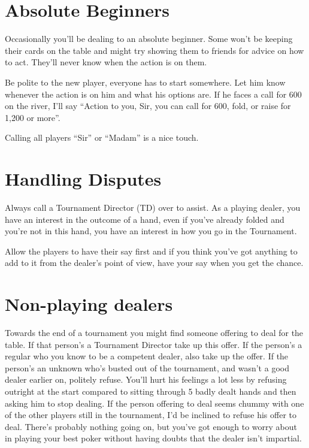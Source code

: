 \section{Absolute Beginners}

Occasionally you'll be dealing to an absolute beginner. Some won't be
keeping their cards on the table and might try showing them to friends
for advice on how to act. They'll never know when the action is on them.

Be polite to the new player, everyone has to start somewhere. Let him
know whenever the action is on him and what his options are. If he
faces a call for 600 on the river, I'll say ``Action to you, Sir, you
can call for 600, fold, or raise for 1,200 or more''.

Calling all players ``Sir'' or ``Madam'' is a nice touch.

\section{Handling Disputes}

Always call a Tournament Director (TD) over to assist. As a playing
dealer, you have an interest in the outcome of a hand, even
if you've already folded and you're not in this hand, you have
an interest in how you go in the Tournament.

Allow the players to have their say first and if you think you've
got anything to add to it from the dealer's point of view, have
your say when you get the chance.

\section{Non-playing dealers}

Towards the end of a tournament you might find someone offering
to deal for the table. If that person's a Tournament Director
take up this offer. If the person's a
regular who you know to be a competent dealer, also take up
the offer. If the person's an unknown who's busted out of the
tournament, and wasn't a good dealer earlier on, politely
refuse. You'll hurt his feelings a lot less by refusing outright
at the start compared to sitting through 5 badly dealt hands
and then asking him to stop dealing. If the person
offering to deal seems chummy with one of the other players
still in the tournament, I'd be inclined to refuse his offer
to deal. There's probably nothing going on, but you've got
enough to worry about in playing your best poker without
having doubts that the dealer isn't impartial.

